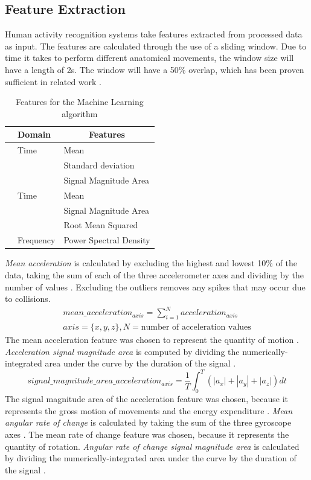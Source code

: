 \subsection{Feature Extraction}
\label{sec:Approach:Feature-Extraction}
Human activity recognition systems take features extracted from processed data as input. The features are calculated through the use of a sliding window. Due to time it takes to perform different anatomical movements, the window size will have a length of 2s. The window will have a 50\% overlap, which has been proven sufficient in related work \cite{Wannenburg2016}.
\begin{table}[h]
	\centering
	\begin{tabular}{c|l|l}
		& \multicolumn{1}{l|}{Domain} & \multicolumn{1}{c}{Features} \\
		\hline
		\parbox[t]{2mm}{} & Time & Mean\\
		&& Standard deviation\\
		&& Signal Magnitude Area\\
		\hline
		\parbox[t]{2mm}{} & Time & Mean\\
		&& Signal Magnitude Area \\
		&& Root Mean Squared \\
		& Frequency & Power Spectral Density \\
	\end{tabular}
	\caption{Features for the Machine Learning algorithm}
	\label{tab:features}
\end{table}
\emph{Mean acceleration} is calculated by excluding the highest and lowest 10\% of the data, taking the sum of each of the three accelerometer axes and dividing by the number of values \cite{Totty2017}. Excluding the outliers removes any spikes that may occur due to collisions.
\begin{align*}
mean\_acceleration_{axis} = \sum_{i=1}^{N}acceleration_{axis}\\
axis = \{x,y,z\}, N = \text{number of acceleration values}
\end{align*}
The mean acceleration feature was chosen to represent the quantity of motion \cite{Arif2015}. \emph{Acceleration signal magnitude area} is computed by dividing the numerically-integrated area under the curve by the duration of the signal \cite{Totty2017}.
$$ signal\_magnitude\_area\_acceleration_{axis}= \frac{1}{T}\int_{0}^{T}(|a_x|+|a_y|+|a_z|)dt$$
The signal magnitude area of the acceleration feature was chosen, because it represents the gross motion of movements and the energy expenditure \cite{Jeran2016}. \emph{Mean angular rate of change} is calculated by taking the sum of the three gyroscope axes \cite{Totty2017}. The mean rate of change feature was chosen, because it represents the quantity of rotation. \emph{Angular rate of change signal magnitude area} is calculated by dividing the numerically-integrated area under the curve by the duration of the signal \cite{Totty2017}.
